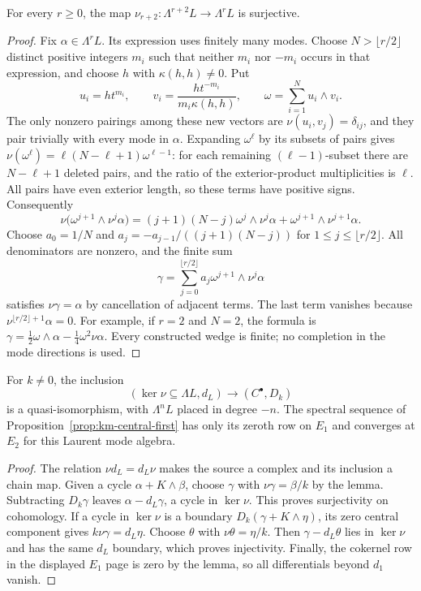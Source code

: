 \begin{lemma}
\label{lem:km-cocycle-surjective}
For every $r\ge0$, the map $\nu_{r+2}:\Lambda^{r+2}L\to\Lambda^rL$ is surjective.
\end{lemma}
\begin{proof}
Fix $\alpha\in\Lambda^rL$.  Its expression uses finitely many modes.
Choose $N>\lfloor r/2\rfloor$ distinct positive integers $m_i$ such that neither
$m_i$ nor $-m_i$ occurs in that expression, and choose $h$ with
$\kappa(h,h)\ne0$.  Put
\[
u_i=ht^{m_i},\qquad v_i=\frac{ht^{-m_i}}{m_i\kappa(h,h)},\qquad
\omega=\sum_{i=1}^N u_i\wedge v_i.
\]
The only nonzero pairings among these new vectors are $\nu(u_i,v_j)=\delta_{ij}$,
and they pair trivially with every mode in $\alpha$.
Expanding $\omega^\ell$ by its subsets of pairs gives
$\nu(\omega^\ell)=\ell(N-\ell+1)\omega^{\ell-1}$:
for each remaining $(\ell-1)$-subset there are $N-\ell+1$ deleted pairs,
and the ratio of the exterior-product multiplicities is $\ell$.
All pairs have even exterior length, so these terms have positive signs.
Consequently
\[
\nu\bigl(\omega^{j+1}\wedge\nu^j\alpha\bigr)
=(j+1)(N-j)\omega^j\wedge\nu^j\alpha
+\omega^{j+1}\wedge\nu^{j+1}\alpha.
\]
Choose $a_0=1/N$ and
$a_j=-a_{j-1}/((j+1)(N-j))$ for $1\le j\le\lfloor r/2\rfloor$.
All denominators are nonzero, and the finite sum
\[
\gamma=\sum_{j=0}^{\lfloor r/2\rfloor}
a_j\omega^{j+1}\wedge\nu^j\alpha
\]
satisfies $\nu\gamma=\alpha$ by cancellation of adjacent terms.
The last term vanishes because $\nu^{\lfloor r/2\rfloor+1}\alpha=0$.
For example, if $r=2$ and $N=2$, the formula is
$\gamma=\tfrac12\omega\wedge\alpha-\tfrac14\omega^2\nu\alpha$.
Every constructed wedge is finite; no completion in the mode directions is used.
\end{proof}

\begin{corollary}
\label{cor:km-kernel-comparison}
For $k\ne0$, the inclusion
\[
(\ker\nu\subseteq\Lambda L,d_L)\longrightarrow(C^\bullet,D_k)
\]
is a quasi-isomorphism, with $\Lambda^nL$ placed in degree $-n$.
The spectral sequence of Proposition~\ref{prop:km-central-first} has only
its zeroth row on $E_1$ and converges at $E_2$ for this Laurent mode algebra.
\end{corollary}
\begin{proof}
The relation $\nu d_L=d_L\nu$ makes the source a complex and its inclusion
a chain map.  Given a cycle $\alpha+K\wedge\beta$, choose $\gamma$ with
$\nu\gamma=\beta/k$ by the lemma.  Subtracting $D_k\gamma$ leaves
$\alpha-d_L\gamma$, a cycle in $\ker\nu$.  This proves surjectivity on cohomology.
If a cycle in $\ker\nu$ is a boundary
$D_k(\gamma+K\wedge\eta)$, its zero central component gives
$k\nu\gamma=d_L\eta$.  Choose $\theta$ with $\nu\theta=\eta/k$.
Then $\gamma-d_L\theta$ lies in $\ker\nu$ and has the same $d_L$ boundary,
which proves injectivity.  Finally, the cokernel row in the displayed
$E_1$ page is zero by the lemma, so all differentials beyond $d_1$ vanish.
\end{proof}


